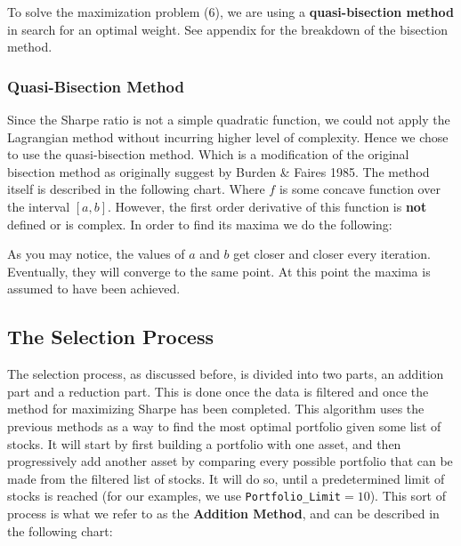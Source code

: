 \documentclass[12pt,titlepage,letter]{article}
\begin{document}
		To solve the maximization problem (6), we are using a \textbf{quasi-bisection method} in search for an optimal weight. See appendix for the breakdown of the bisection method.  

	\subsubsection{Quasi-Bisection Method}
		Since the Sharpe ratio is not a simple quadratic function, we could not apply the Lagrangian method without incurring higher level of complexity. Hence we chose to use the quasi-bisection method. Which is a modification of the original bisection method as originally suggest by Burden \& Faires 1985. The method itself is described in the following chart. Where $f$ is some concave function over the interval $[a,b]$. However, the first order derivative of this function is \textbf{not} defined or is complex. In order to find its maxima we do the following:
		\begin{center}
		\end{center}
		As you may notice, the values of $a$ and $b$ get closer and closer every iteration. Eventually, they will converge to the same point. At this point the maxima is assumed to have been achieved.

	\subsection{The Selection Process}
		The selection process, as discussed before, is divided into two parts, an addition part and a reduction part. This is done once the data is filtered and once the method for maximizing Sharpe has been completed. This algorithm uses the previous methods as a way to find the most optimal portfolio given some list of stocks. It will start by first building a portfolio with one asset, and then progressively add another asset by comparing every possible portfolio that can be made from the filtered list of stocks. It will do so, until a predetermined limit of stocks is reached (for our examples, we use \verb|Portfolio_Limit|$=10$). This sort of process is what we refer to as the \textbf{Addition Method}, and can be described in the following chart:\\
\end{document}
